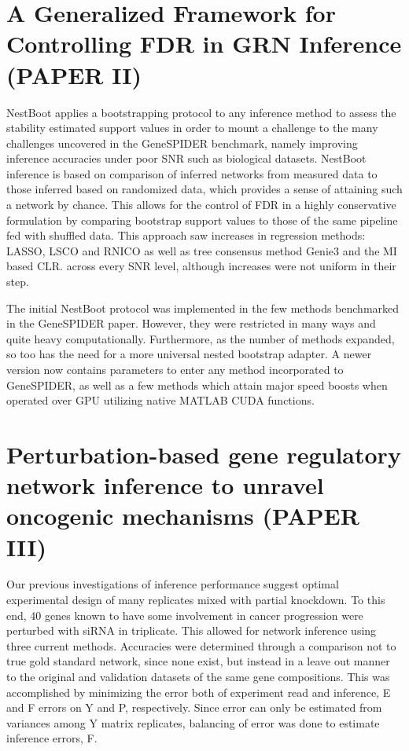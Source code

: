\section{A Generalized Framework for Controlling FDR in GRN Inference (PAPER II)}\label{sec:paper2}

NestBoot applies a bootstrapping protocol to any inference method to assess the stability estimated support values in order to mount a challenge to the many challenges uncovered in the GeneSPIDER benchmark, namely improving inference accuracies under poor SNR such as biological datasets. NestBoot inference is based on comparison of inferred networks from measured data to those inferred based on randomized data, which provides a sense of attaining such a network by chance. This allows for the control of FDR in a highly conservative formulation by comparing bootstrap support values to those of the same pipeline fed with shuffled data. This approach saw increases in regression methods: LASSO, LSCO and RNICO as well as tree consensus method Genie3 and the MI based CLR. across every SNR level, although increases were not uniform in their step.

The initial NestBoot protocol was implemented in the few methods benchmarked in the GeneSPIDER paper. However, they were restricted in many ways and quite heavy computationally. Furthermore, as the number of methods expanded, so too has the need for a more universal nested bootstrap adapter. A newer version now contains parameters to enter any method incorporated to GeneSPIDER, as well as a few methods which attain major speed boosts when operated over GPU utilizing native MATLAB CUDA functions. 

\section{Perturbation-based gene regulatory network inference to unravel oncogenic mechanisms (PAPER III)}\label{sec:paper3}

Our previous investigations of inference performance suggest optimal experimental design of many replicates mixed with partial knockdown. To this end, 40 genes known to have some involvement in cancer progression were perturbed with siRNA in triplicate. This allowed for network inference using three current methods. Accuracies were determined through a comparison not to true gold standard network, since none exist, but instead in a leave out manner to the original and validation datasets of the same gene compositions. This was accomplished by minimizing the error both of experiment read and inference, \ie E and F errors on Y and P, respectively. Since error can only be estimated from variances among Y matrix replicates, balancing of error was done to estimate inference errors, F.


